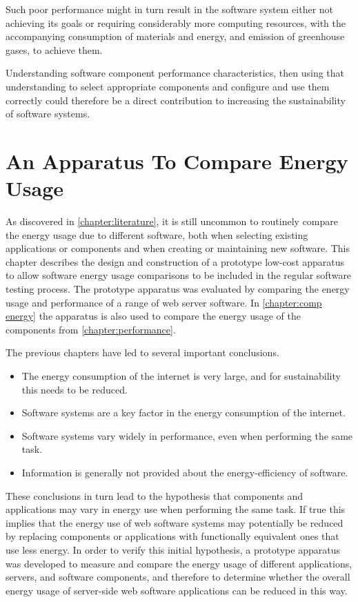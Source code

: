 Such poor performance might in turn result in the software system either not achieving its goals or requiring considerably more computing resources, with the accompanying consumption of materials and energy, and emission of greenhouse gases, to achieve them.

Understanding software component performance characteristics, then using that understanding to select appropriate components and configure and use them correctly could therefore be a direct contribution to increasing the sustainability of software systems.



\chapter{An Apparatus To Compare Energy Usage}
\label{chapter:testrig}

As discovered in \autoref{chapter:literature}, it is still uncommon to routinely compare the energy usage due to different software, both when selecting existing applications or components and when creating or maintaining new software. This chapter describes the design and construction of a prototype low-cost apparatus to allow software energy usage comparisons to be included in the regular software testing process. The prototype apparatus was evaluated by comparing the energy usage and performance of a range of web server software. In \autoref{chapter:comp energy} the apparatus is also used to compare the energy usage of the components from \autoref{chapter:performance}.

The previous chapters have led to several important conclusions.

\begin{itemize}
\item The energy consumption of the internet is very large, and for sustainability this needs to be reduced.
\item Software systems are a key factor in the energy consumption of the internet.
\item Software systems vary widely in performance, even when performing the same task.
\item Information is generally not provided about the energy-efficiency of software.
\end{itemize}

These conclusions in turn lead to the hypothesis that components and applications may vary in energy use when performing the same task. If true this implies that the energy use of web software systems may potentially be reduced by replacing components or applications with functionally equivalent ones that use less energy. In order to verify this initial hypothesis, a prototype apparatus was developed to measure and compare the energy usage of different applications, servers, and software components, and therefore to determine whether the overall energy usage of server-side web software applications can be reduced in this way.

